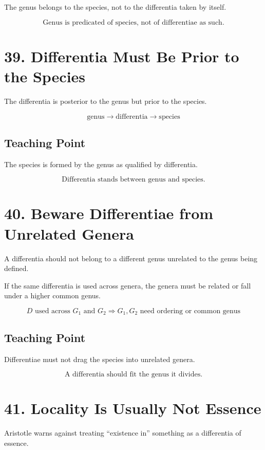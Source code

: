 \documentclass[12pt]{article}
\begin{document}
The genus belongs to the species, not to the differentia taken by itself.

\[
\boxed{
\text{Genus is predicated of species, not of differentiae as such.}
}
\]

\section*{39. Differentia Must Be Prior to the Species}

The differentia is posterior to the genus but prior to the species.

\[
\text{genus} \rightarrow \text{differentia} \rightarrow \text{species}
\]

\subsection*{Teaching Point}

The species is formed by the genus as qualified by differentia.

\[
\boxed{
\text{Differentia stands between genus and species.}
}
\]

\section*{40. Beware Differentiae from Unrelated Genera}

A differentia should not belong to a different genus unrelated to the genus
being defined.

If the same differentia is used across genera, the genera must be related or
fall under a higher common genus.

\[
D \text{ used across } G_1 \text{ and } G_2
\Rightarrow
G_1, G_2 \text{ need ordering or common genus}
\]

\subsection*{Teaching Point}

Differentiae must not drag the species into unrelated genera.

\[
\boxed{
\text{A differentia should fit the genus it divides.}
}
\]

\section*{41. Locality Is Usually Not Essence}

Aristotle warns against treating ``existence in'' something as a differentia of
essence.
\end{document}
